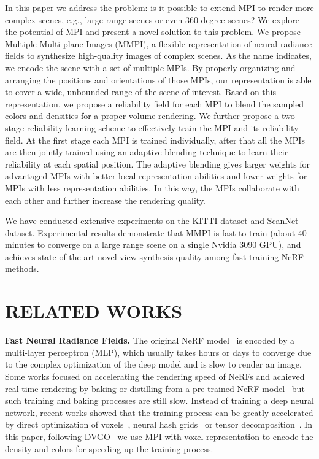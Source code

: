 \documentclass[letterpaper, 10 pt, conference]{ieeeconf}  %
\newcommand{\ourmethod}{MMPI}
\begin{document}
In this paper we address the problem: is it possible to extend MPI to render more complex scenes, e.g., large-range scenes or even 360-degree scenes?
We explore the potential of MPI and present a novel solution to this problem.
We propose Multiple Multi-plane Images (\ourmethod), a flexible representation of neural radiance fields to synthesize high-quality images of complex scenes.
As the name indicates, we encode the scene with a set of multiple MPIs.
By properly organizing and arranging the positions and orientations of those MPIs, our representation is able to cover a wide, unbounded range of the scene of interest.
Based on this representation, we propose a reliability field for each MPI to blend the sampled colors and densities for a proper volume rendering.
We further propose a two-stage reliability learning scheme to effectively train the MPI and its reliability field. At the first stage each MPI is trained individually, after that all the MPIs are then jointly trained using an adaptive blending technique to learn their reliability at each spatial position.
The adaptive blending gives larger weights for advantaged MPIs with better local representation abilities and lower weights for MPIs with less representation abilities.
In this way, the MPIs collaborate with each other and further increase the rendering quality.

We have conducted extensive experiments on the KITTI dataset and ScanNet dataset. Experimental results demonstrate that MMPI is fast to train (about 40 minutes to converge on a large range scene on a single Nvidia 3090 GPU), and achieves state-of-the-art novel view synthesis quality among fast-training NeRF methods.






\section{RELATED WORKS}
\noindent
{\bf Fast Neural Radiance Fields.} The original NeRF model~\cite{mildenhall2020nerf} is encoded by a multi-layer perceptron (MLP), which usually takes hours or days to converge due to the complex optimization of the deep model and is slow to render an image.
Some works focused on accelerating the rendering speed of NeRFs and achieved real-time rendering by baking or distilling from a pre-trained NeRF model~\cite{yu2021plenoxels,hedman2021baking,reiser2021kilonerf} but such training and baking processes are still slow.
Instead of training a deep neural network, recent works showed that the training process can be greatly accelerated by direct optimization of voxels~\cite{sun2021direct,yu2021plenoxels}, neural hash grids~\cite{muller2022instant,tancik2023nerfstudio,li2022nerfacc} or tensor decomposition~\cite{chen2022tensorf,tang2022compressible}.
In this paper, following DVGO~\cite{sun2021direct} we use MPI with voxel representation to encode the density and colors for speeding up the training process.
\end{document}
